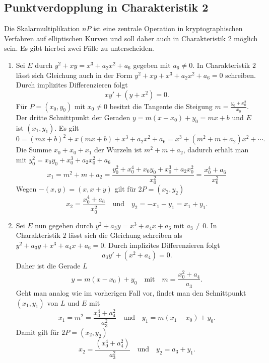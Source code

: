 \subsection{Punktverdopplung in Charakteristik 2}
Die Skalarmultiplikation $nP$ ist eine zentrale Operation in kryptographischen Verfahren auf elliptischen Kurven und soll daher auch in Charakteristik 2 möglich sein. Es gibt hierbei zwei Fälle zu unterscheiden.

\begin{enumerate}
    \item Sei $E$ durch \(y^2+xy=x^3+a_2x^2+a_6\) gegeben mit $a_6\neq0$. In Charakteristik $2$ lässt sich Gleichung auch in der Form \(y^2+xy+x^3+a_2x^2+a_6=0\) schreiben. Durch implizites Differenzieren folgt
          \[
              xy'+(y+x^2)=0.
          \]
          Für $P=(x_0,y_0)$ mit $x_0\neq0$ besitzt die Tangente die Steigung $m=\frac{y_0+x_0^2}{x_0}$. Der dritte Schnittpunkt der Geraden \(y=m(x-x_0)+y_0=mx+b\) und $E$ ist $(x_1,y_1)$. Es gilt
          \[
              0={(mx+b)}^2+x(mx+b)+x^3+a_2x^2+a_6=x^3+(m^2+m+a_2)x^2+\cdots.
          \]
          Die Summe $x_0+x_0+x_1$ der Wurzeln ist $m^2+m+a_2$, dadurch erhält man mit $y_0^2=x_0y_0+x_0^3+a_2x_0^2+a_6$
          \[
              x_1 = m^2+m+a_2=\frac{y_0^2+x_0^4+x_0y_0+x_0^3+a_2x_0^2}{x_0^2} =\frac{x_0^4+a_6}{x_0^2}
          \]
          Wegen $-(x,y)=(x,x+y)$ gilt für $2P=(x_2,y_2)$
          \[
              x_2=\frac{x_0^4+a_6}{x_0^2} \quad \text{und}\quad y_2=-x_1-y_1=x_1+y_1.
          \]
    \item Sei $E$ nun gegeben durch $y^2 +a_3y = x^3 +a_4x+a_6$ mit $a_3\neq 0$. In Charakteristik $2$ lässt sich die Gleichung schreiben als $y^2 +a_3y + x^3 +a_4x+a_6=0$. Durch implizites Differenzieren folgt
          \[
              a_3y'+(x^2+a_4)=0.
          \]
          Daher ist die Gerade $L$
          \[
              y=m(x-x_0)+y_0 \quad \text{mit}\quad m=\frac{x_0^2+a_4}{a_3}.
          \]
          Geht man analog wie im vorherigen Fall vor, findet man den Schnittpunkt $(x_1,y_1)$ von $L$ und $E$ mit
          \[
              x_1=m^2=\frac{x_0^4+a_4^2}{a_3^2} \quad\text{und}\quad y_1=m(x_1-x_0)+y_0.
          \]
          Damit gilt für $2P=(x_2,y_2)$
          \[
              x_2=\frac{(x_0^4+a_4^2)}{a_3^2}\quad\text{und}\quad y_2=a_3+y_1.
          \]
\end{enumerate}